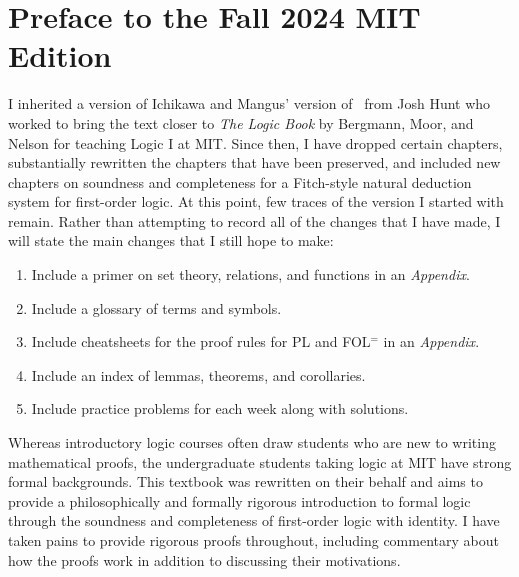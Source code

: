 
\chapter*{Preface to the Fall 2024 MIT Edition}
\label{ch.preface2}

I inherited a version of Ichikawa and Mangus' version of \forallx\ from Josh Hunt who worked to bring the text closer to \textit{The Logic Book} by Bergmann, Moor, and Nelson for teaching Logic I at MIT.
Since then, I have dropped certain chapters, substantially rewritten the chapters that have been preserved, and included new chapters on soundness and completeness for a Fitch-style natural deduction system for first-order logic.
At this point, few traces of the version I started with remain.
Rather than attempting to record all of the changes that I have made, I will state the main changes that I still hope to make:

  \begin{enumerate}
    \item Include a primer on set theory, relations, and functions in an \textit{Appendix}.
    \item Include a glossary of terms and symbols.
    \item Include cheatsheets for the proof rules for PL and FOL$^=$ in an \textit{Appendix}.
    \item Include an index of lemmas, theorems, and corollaries.
    \item Include practice problems for each week along with solutions.
  \end{enumerate}

Whereas introductory logic courses often draw students who are new to writing mathematical proofs, the undergraduate students taking logic at MIT have strong formal backgrounds.
This textbook was rewritten on their behalf and aims to provide a philosophically and formally rigorous introduction to formal logic through the soundness and completeness of first-order logic with identity.
I have taken pains to provide rigorous proofs throughout, including commentary about how the proofs work in addition to discussing their motivations.

